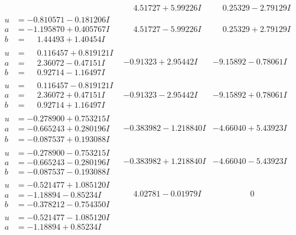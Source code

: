 \documentclass[1p]{elsarticle_modified}
\theoremstyle{definition}
\begin{document}
$$\begin{array}{c|c|c}
 & \phantom{-}4.51727 + 5.99226 I & \phantom{-}0.25329 - 2.79129 I \\ \hline\begin{aligned}
u &= -0.810571 - 0.181206 I \\
a &= -1.195870 + 0.405767 I \\
b &= \phantom{-}1.44493 + 1.40454 I\end{aligned}
 & \phantom{-}4.51727 - 5.99226 I & \phantom{-}0.25329 + 2.79129 I \\ \hline\begin{aligned}
u &= \phantom{-}0.116457 + 0.819121 I \\
a &= \phantom{-}2.36072 - 0.47151 I \\
b &= \phantom{-}0.92714 - 1.16497 I\end{aligned}
 & -0.91323 + 2.95442 I & -9.15892 - 0.78061 I \\ \hline\begin{aligned}
u &= \phantom{-}0.116457 - 0.819121 I \\
a &= \phantom{-}2.36072 + 0.47151 I \\
b &= \phantom{-}0.92714 + 1.16497 I\end{aligned}
 & -0.91323 - 2.95442 I & -9.15892 + 0.78061 I \\ \hline\begin{aligned}
u &= -0.278900 + 0.753215 I \\
a &= -0.665243 + 0.280196 I \\
b &= -0.087537 + 0.193088 I\end{aligned}
 & -0.383982 - 1.218840 I & -4.66040 + 5.43923 I \\ \hline\begin{aligned}
u &= -0.278900 - 0.753215 I \\
a &= -0.665243 - 0.280196 I \\
b &= -0.087537 - 0.193088 I\end{aligned}
 & -0.383982 + 1.218840 I & -4.66040 - 5.43923 I \\ \hline\begin{aligned}
u &= -0.521477 + 1.085120 I \\
a &= -1.18894 - 0.85234 I \\
b &= -0.378212 - 0.754350 I\end{aligned}
 & \phantom{-}4.02781 - 0.01979 I & \phantom{-0.000000 } 0 \\ \hline\begin{aligned}
u &= -0.521477 - 1.085120 I \\
a &= -1.18894 + 0.85234 I \\

\end{aligned}
\end{array}$$
\end{document}
